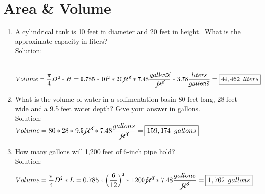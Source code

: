 \section{Area \& Volume}
\begin{enumerate}

\item A cylindrical tank is 10 feet in diameter and 20 feet in height. 'What is the approximate capacity in liters?\\
Solution:\\

\\

$Volume=\dfrac{\pi}{4}D^2*H=0.785*10^2*20\cancel{ft^3}*7.48\dfrac{\cancel{gallons}}{\cancel{ft^3}}*3.78\dfrac{liters}{\cancel{gallons}}=\boxed{44,462 \enspace liters}$

\item What is the volume of water in a sedimentation basin 80 feet long, 28 feet wide and a 9.5 feet water depth? Give your answer in gallons.\\
Solution:\\
$Volume=80*28*9.5 \cancel{ft^3}*7.48\dfrac{gallons}{\cancel{ft^3}}=\boxed{159,174 \enspace gallons} $

\item How many gallons will 1,200 feet of 6-inch pipe hold?\\
Solution:\\
\begin{center}
\end{center}
$Volume=\dfrac{\pi}{4}D^2*L=0.785*\Big(\dfrac{6}{12}\Big)^2*1200\cancel{ft^3}*7.48\dfrac{gallons}{\cancel{ft^3}}=\boxed{1,762 \enspace gallons}$


\end{enumerate}
